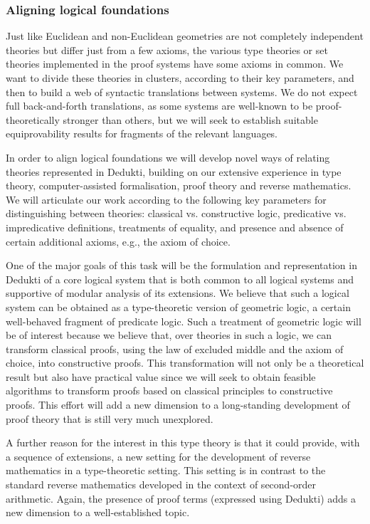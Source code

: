 \subsubsection*{Aligning logical foundations}
Just like Euclidean and non-Euclidean geometries are not completely
independent theories but differ just from a few axioms, the various
type theories or set theories implemented in the proof systems have
some axioms in common.  We want to divide these theories in clusters,
according to their key parameters, and then to build a web of
syntactic translations between systems. We do not expect full
back-and-forth translations, as some systems are well-known to be
proof-theoretically stronger than others, but we will seek to
establish suitable equiprovability results for fragments of the
relevant languages.

In order to align logical foundations we will develop novel ways of
relating theories represented in Dedukti, building on our extensive
experience in type theory, computer-assisted
formalisation, proof theory and reverse mathematics. We will
articulate our work according to the following key parameters for
distinguishing between theories: classical vs. constructive logic,
predicative vs. impredicative definitions, treatments of equality, and
presence and absence of certain additional axioms, e.g., the axiom of
choice.

One of the major goals of this task will be the formulation and
representation in Dedukti of a core logical system that is both common
to all logical systems and supportive of modular analysis of its
extensions. We believe that such a logical system can be obtained as a
type-theoretic version of geometric logic, a certain well-behaved
fragment of predicate logic.  Such a treatment of geometric logic will
be of interest because we believe that, over theories in such a logic,
we can transform classical proofs, using the law of excluded middle
and the axiom of choice, into constructive proofs.  This
transformation will not only be a theoretical result but also have
practical value since we will seek to obtain feasible algorithms to
transform proofs based on classical principles to constructive proofs.
This effort will add a new dimension to a long-standing development of
proof theory that is still very much unexplored.

A further reason for the interest in this type theory is that it could
provide, with a sequence of extensions, a new setting for the
development of reverse mathematics in a type-theoretic setting. This
setting is in contrast to the standard reverse mathematics developed
in the context of second-order arithmetic. Again, the presence of
proof terms (expressed using Dedukti) adds a new dimension to a
well-established topic.

